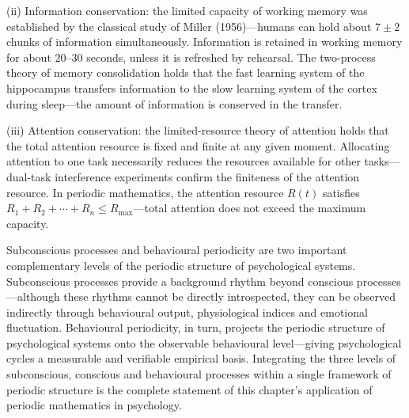 \begin{remark}
(ii) Information conservation: the limited capacity of working memory was established by the classical study of Miller (1956)---humans can hold about $7 \pm 2$ chunks of information simultaneously. Information is retained in working memory for about $20$--$30$ seconds, unless it is refreshed by rehearsal. The two-process theory of memory consolidation holds that the fast learning system of the hippocampus transfers information to the slow learning system of the cortex during sleep---the amount of information is conserved in the transfer.

(iii) Attention conservation: the limited-resource theory of attention holds that the total attention resource is fixed and finite at any given moment. Allocating attention to one task necessarily reduces the resources available for other tasks---dual-task interference experiments confirm the finiteness of the attention resource. In periodic mathematics, the attention resource $R(t)$ satisfies $R_1 + R_2 + \cdots + R_n \le R_{\max}$---total attention does not exceed the maximum capacity.
\end{remark}

\begin{remark}
Subconscious processes and behavioural periodicity are two important complementary levels of the periodic structure of psychological systems. Subconscious processes provide a background rhythm beyond conscious processes---although these rhythms cannot be directly introspected, they can be observed indirectly through behavioural output, physiological indices and emotional fluctuation. Behavioural periodicity, in turn, projects the periodic structure of psychological systems onto the observable behavioural level---giving psychological cycles a measurable and verifiable empirical basis. Integrating the three levels of subconscious, conscious and behavioural processes within a single framework of periodic structure is the complete statement of this chapter's application of periodic mathematics in psychology.
\end{remark}

